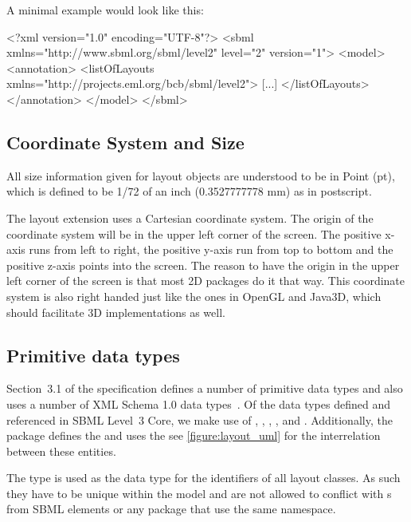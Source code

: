\begin{center}
\end{center}

A minimal example would look like this: 

\begin{example}
<?xml version="1.0" encoding="UTF-8"?>
 <sbml xmlns="http://www.sbml.org/sbml/level2" level="2" version="1">
   <model>
	  <annotation>
		  <listOfLayouts xmlns="http://projects.eml.org/bcb/sbml/level2">
			 [...]
			</listOfLayouts>
		</annotation>
	 </model>
	</sbml>
\end{example}

\subsection{Coordinate System and Size} All size information given for 
layout objects are understood to be in Point (pt), which is defined to be 1/72 of an inch (0.3527777778 
mm) as in postscript. 

The layout extension uses a Cartesian coordinate system. The origin of 
the coordinate system will be in the upper left corner of the screen. 
The positive x-axis runs from left to right, the positive y-axis run 
from top to bottom and the positive z-axis points into the screen. The 
reason to have the origin in the upper left corner of the screen is that 
most 2D packages do it that way. This coordinate system is also 
right handed just like the ones in OpenGL and Java3D, which should 
facilitate 3D implementations as well. 

\subsection{Primitive data types} \label{primtypes} 

Section~3.1 of the \sbmlthreecore specification defines a number of 
primitive data types and also uses a number of XML Schema 1.0 data 
types~\citep{biron:2000}. Of the data types defined and referenced in SBML Level~3 Core, we make use of 
, , , 
,  and . Additionally, the 
\Layout package defines the  and uses the  see 
\ref{figure:layout_uml} for the interrelation between these entities. 

The  type is used as the data type for the identifiers of 
all layout classes. As such they have to be unique within the model and are not allowed to conflict with s from SBML elements or any package that use the same  namespace. 

